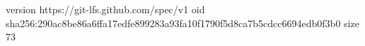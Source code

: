 version https://git-lfs.github.com/spec/v1
oid sha256:290ac8be86a6ffa17edfe899283a93fa10f1790f5d8ca7b5cdcc6694edb0f3b0
size 73
